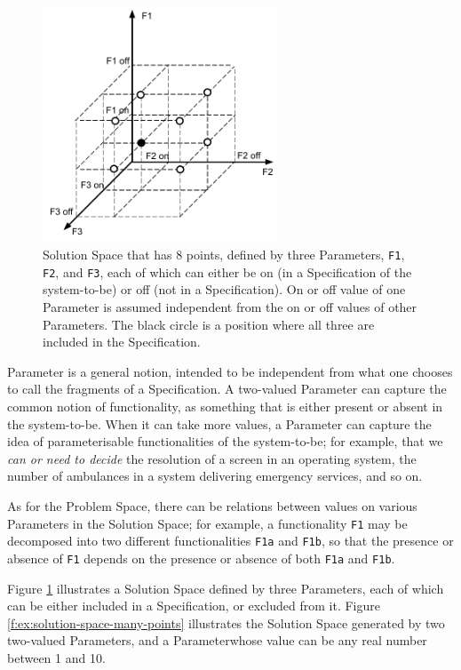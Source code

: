 \documentclass[graybox]{svmult}
\newcommand{\zi}[1]{\textit{#1}}
\newcommand{\xt}[1]{\texttt{#1}}
\newcommand{\req}[1]{\xt{#1}}
\newcommand{\SolutionSpace}{Solution Space}
\newcommand{\ProblemSpace}{Problem Space}
\newcommand{\Specification}{Specification}
\newcommand{\Parameter}{Parameter}
\begin{document}
\begin{figure}[t]
	\centering
	\includegraphics[height=70mm]{Figures/f-ex-solution-space-8-points}
\caption{\SolutionSpace{} that has 8 points, defined by three \Parameter s, \req{F1}, \req{F2}, and \req{F3}, each of which can either be on (in a \Specification{} of the system-to-be) or off (not in a \Specification). On or off value of one \Parameter{} is assumed independent from the on or off values of other \Parameter s. The black circle is a position where all three are included in the \Specification.}
\label{f:ex:solution-space-8-points}
\end{figure}

\Parameter{} is a general notion, intended to be independent from what one chooses to call the fragments of a \Specification. A two-valued \Parameter{} can capture the common notion of functionality, as something that is either present or absent in the system-to-be. When it can take more values, a \Parameter{} can capture the idea of parameterisable functionalities of the system-to-be; for example, that we \zi{can or need to decide} the resolution of a screen in an operating system, the number of ambulances in a system delivering emergency services, and so on.

As for the \ProblemSpace, there can be relations between values on various \Parameter s in the \SolutionSpace; for example, a functionality \req{F1} may be decomposed into two different functionalities \req{F1a} and \req{F1b}, so that the presence or absence of \req{F1} depends on the presence or absence of both \req{F1a} and \req{F1b}.

Figure \ref{f:ex:solution-space-8-points} illustrates a \SolutionSpace{} defined by three \Parameter s, each of which can be either included in a \Specification, or excluded from it. Figure \ref{f:ex:solution-space-many-points} illustrates the \SolutionSpace{} generated by two two-valued \Parameter s, and a \Parameter whose value can be any real number between 1 and 10.
\end{document}
